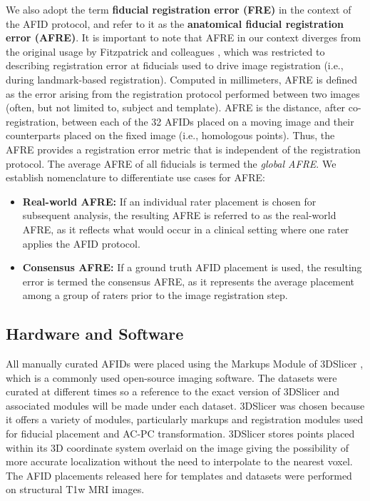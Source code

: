 We also adopt the term \textbf{fiducial registration error (FRE)} in the context of the AFID protocol, and refer to it as the \textbf{anatomical fiducial registration error (AFRE)}. It is important to note that AFRE in our context diverges from the original usage by Fitzpatrick and colleagues \cite{Fitzpatrick1998-hp}, which was restricted to describing registration error at fiducials used to drive image registration (i.e., during landmark-based registration). Computed in millimeters, AFRE is defined as the error arising from the registration protocol performed between two images (often, but not limited to, subject and template). AFRE is the distance, after co-registration, between each of the 32 AFIDs placed on a moving image and their counterparts placed on the fixed image (i.e., homologous points). Thus, the AFRE provides a registration error metric that is independent of the registration protocol. The average AFRE of all fiducials is termed the \emph{global AFRE}. We  establish nomenclature to differentiate use cases for AFRE:
\begin{itemize}
    \item \textbf{Real-world AFRE:} If an individual rater placement is chosen for subsequent analysis, the resulting AFRE is referred to as the real-world AFRE, as it reflects what would occur in a clinical setting where one rater applies the AFID protocol.
    \item \textbf{Consensus AFRE:} If a ground truth AFID placement is used, the resulting error is termed the consensus AFRE, as it represents the average placement among a group of raters prior to the image registration step.
\end{itemize}

\subsection{Hardware and Software}
All manually curated AFIDs were placed using the Markups Module of 3DSlicer \cite{Fedorov2012-rk}, which is a commonly used open-source imaging software. The datasets were curated at different times so a reference to the exact version of 3DSlicer and associated modules will be made under each dataset. 3DSlicer was chosen because it offers a variety of modules, particularly markups and registration modules used for fiducial placement and AC-PC transformation. 3DSlicer stores points placed within its 3D coordinate system overlaid on the image giving the possibility of more accurate localization without the need to interpolate to the nearest voxel. The AFID placements released here for templates and datasets were performed on structural T1w MRI images.

